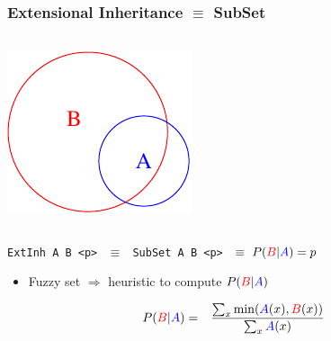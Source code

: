 \documentclass{beamer}
\begin{document}
\frame
{
  \frametitle{Extensional Inheritance $\equiv$ SubSet}

  \begin{columns}
    \column{1.5in}
    
    \includegraphics[scale=0.7]{subset_A_B.pdf}

    \column{1.5in}


  \end{columns}

  {\tt ExtInh {\color{blue}A} {\color{red}B} <p>
    $\ \equiv\ $
    {\tt SubSet {\color{blue}A} {\color{red}B} <p>}
    $\ \equiv\ P({\color{red}B}|{\color{blue}A})=p$}\\[2ex]

  \pause

  \begin{itemize}
  \item
    Fuzzy set $\Rightarrow$ heuristic to compute 
    $P({\color{red}B}|{\color{blue}A})$
  \end{itemize}

  \begin{eqnarray*}
    P({\color{red}B}|{\color{blue}A})
    &
    =
    &
    \frac{\sum_x \min({\color{blue}A}(x), {\color{red}B}(x))}
    {\sum_x {\color{blue}A}(x)}
  \end{eqnarray*}

}
\end{document}
